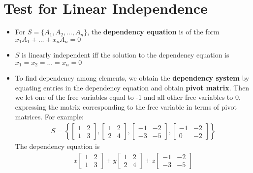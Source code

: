 
\section{Test for Linear Independence}

\begin{itemize}
  \item For $S = \{ A_1, A_2, \ldots, A_n \}$, the \textbf{dependency equation} is of the form $x_1 A_1 + \ldots + x_n A_n = 0$
  \item $S$ is linearly independent iff the solution to the dependency equation is $x_1 = x_2 = \ldots = x_n = 0$
  \item To find dependency among elements, we obtain the \textbf{dependency system} by equating entries in the dependency equation and obtain \textbf{pivot matrix}.
    Then we let one of the free variables equal to -1 and all other free variables to 0, expressing the matrix corresponding to the free variable in terms of pivot matrices.
    For example:
    \begin{align*}
      S = \left\{
        \begin{bmatrix}
          1 & 2\\ 1 & 3
        \end{bmatrix},
        \begin{bmatrix}
          1 & 2\\ 2 & 4
        \end{bmatrix},
        \begin{bmatrix}
          -1 & -2\\ -3 & -5
        \end{bmatrix},
        \begin{bmatrix}
          -1 & -2\\ 0 & -2
        \end{bmatrix}
      \right\}
    \end{align*}
    The dependency equation is
    \begin{align*}
        x \begin{bmatrix}
          1 & 2\\ 1 & 3
        \end{bmatrix}
        +
        y \begin{bmatrix}
          1 & 2\\ 2 & 4
        \end{bmatrix}
        +
        z \begin{bmatrix}
          -1 & -2\\ -3 & -5

\end{bmatrix}
\end{align*}
\end{itemize}
